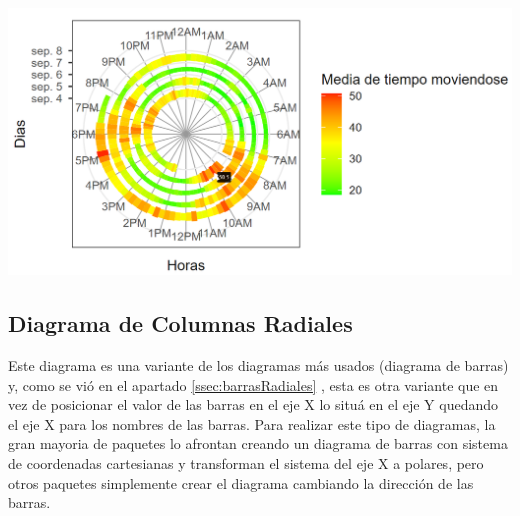 \documentclass{article}\usepackage[]{graphicx}\usepackage[]{color}
\begin{document}
\vbox{
    \centering
    \includegraphics[width=1\textwidth]{imag/espiral_inte_2}
}
\clearpage
\subsection{Diagrama de Columnas Radiales}\label{ssec:columnasRadiales}
Este diagrama es una variante de los diagramas m\'as usados (diagrama de barras) y, como se vi\'o en el apartado \autoref{ssec:barrasRadiales}
, esta es otra variante que en vez de posicionar el valor de las barras en el eje X lo situ\'a en el eje Y quedando el eje X para los nombres de las barras.
Para realizar este tipo de diagramas, la gran mayoria de paquetes lo afrontan creando un diagrama de barras con sistema de coordenadas cartesianas y transforman el sistema del eje X a polares, pero otros paquetes simplemente crear el diagrama cambiando la direcci\'on de las barras.
\end{document}
